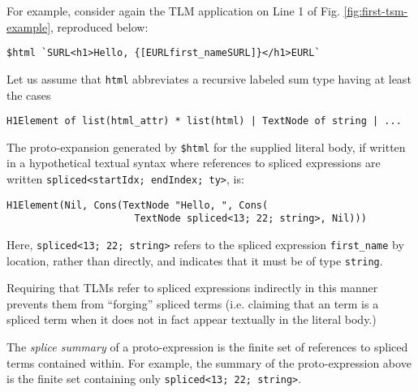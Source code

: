 \documentclass[acmsmall,10pt,review,anonymous]{acmart}\settopmatter{printfolios=true}
\newcommand{\li}[1]{\lstinline{#1}}
\begin{document}
For example, consider again the TLM application on Line 1 of Fig. \ref{fig:first-tsm-example}, reproduced below:
\begin{lstlisting}[numbers=none]
  $html `SURL<h1>Hello, {[EURLfirst_nameSURL]}</h1>EURL`
\end{lstlisting}
Let us assume that \li{html} abbreviates a recursive labeled sum type having at least the cases
\begin{lstlisting}[numbers=none]
  H1Element of list(html_attr) * list(html) | TextNode of string | ...
\end{lstlisting}
The proto-expansion generated by \li{$html} for the supplied literal body, if written in a hypothetical textual syntax where references to spliced expressions are written \li{spliced<startIdx; endIndex; ty>}, is:
\begin{lstlisting}[numbers=none]
  H1Element(Nil, Cons(TextNode "Hello, ", Cons(
                      TextNode spliced<13; 22; string>, Nil)))
\end{lstlisting}
Here, \li{spliced<13; 22; string>} refers to the spliced expression \li{first_name} by location, rather than directly, and indicates that it must be of type \li{string}.

Requiring that TLMs refer to spliced expressions indirectly in this manner prevents them from ``forging'' spliced terms (i.e. claiming that an term is a spliced term when it does not in fact appear textually in the literal body.)%





The \emph{splice summary} of a proto-expression is the finite set of references to spliced terms contained within. For example, the summary of the proto-expression above is the finite set containing only \li{spliced<13; 22; string>}.%
\end{document}
